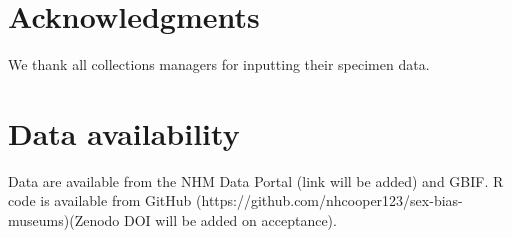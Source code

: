 \documentclass[a4paper, 12pt]{article}
\begin{document}
\section{Acknowledgments}
We thank all collections managers for inputting their specimen data.






\section{Data availability}\label{data-code-and-materials}
Data are available from the NHM Data Portal (link will be added) and GBIF. 
R code is available from GitHub (https://github.com/nhcooper123/sex-bias-museums)(Zenodo DOI will be added on acceptance).
\end{document}
